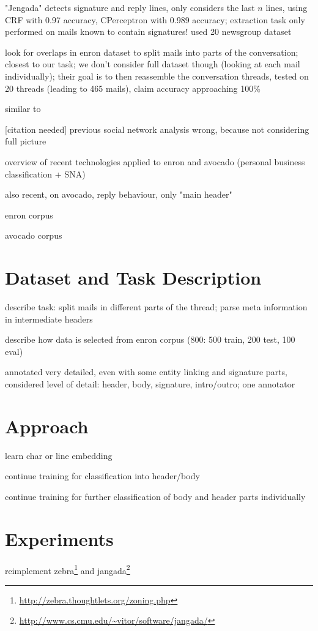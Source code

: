 \documentclass{llncs}
\begin{document}
\cite{signature} "Jengada" detects signature and reply lines, only considers the last $n$ lines, using CRF with 0.97 accuracy, CPerceptron with 0.989 accuracy; extraction task only performed on mails known to contain signatures! used 20 newsgroup dataset \cite{20news}

\cite{headerless} look for overlaps in enron dataset to split mails into parts of the conversation; closest to our task; we don't consider full dataset though (looking at each mail individually); their goal is to then reassemble the conversation threads, tested on 20 threads (leading to 465 mails), claim accuracy approaching 100\%

\cite{similarity} similar to \cite{headerless}

[citation needed] previous social network analysis wrong, because not considering full picture

\cite{workhard} overview of recent technologies applied to enron and avocado (personal business classification + SNA)

\cite{replying} also recent, on avocado, reply behaviour, only "main header"

\cite{enron} enron corpus

\cite{avocado} avocado corpus

\section{Dataset and Task Description}
describe task: split mails in different parts of the thread; parse meta information in intermediate headers

describe how data is selected from enron corpus (800: 500 train, 200 test, 100 eval)

annotated very detailed, even with some entity linking and signature parts, considered level of detail: header, body, signature, intro/outro; one annotator

\section{Approach}
learn char or line embedding

continue training for classification into header/body

continue training for further classification of body and header parts individually

\section{Experiments}
reimplement zebra\footnote{\url{http://zebra.thoughtlets.org/zoning.php}} and jangada\footnote{\url{http://www.cs.cmu.edu/~vitor/software/jangada/}}
\end{document}
